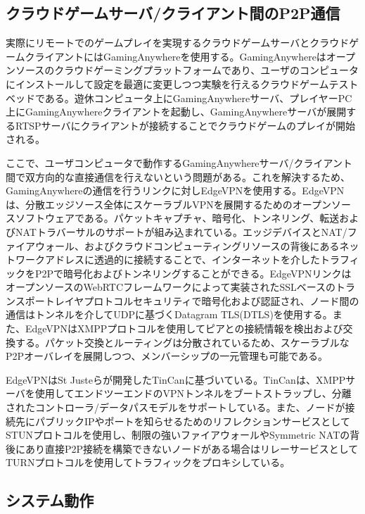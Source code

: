\subsection{クラウドゲームサーバ/クライアント間のP2P通信}
実際にリモートでのゲームプレイを実現するクラウドゲームサーバとクラウドゲームクライアントにはGamingAnywhereを使用する。GamingAnywhereはオープンソースのクラウドゲーミングプラットフォームであり、ユーザのコンピュータにインストールして設定を最適に変更しつつ実験を行えるクラウドゲームテストベッドである。遊休コンピュータ上にGamingAnywhereサーバ、プレイヤーPC上にGamingAnywhereクライアントを起動し、GamingAnywhereサーバが展開するRTSPサーバにクライアントが接続することでクラウドゲームのプレイが開始される。

ここで、ユーザコンピュータで動作するGamingAnywhereサーバ/クライアント間で双方向的な直接通信を行えないという問題がある。これを解決するため、GamingAnywhereの通信を行うリンクに対しEdgeVPN\cite{edgevpn}を使用する。EdgeVPNは、分散エッジソース全体にスケーラブルVPNを展開するためのオープンソースソフトウェアである。パケットキャプチャ、暗号化、トンネリング、転送およびNATトラバーサルのサポートが組み込まれている。エッジデバイスとNAT/ファイアウォール、およびクラウドコンピューティングリソースの背後にあるネットワークアドレスに透過的に接続することで、インターネットを介したトラフィックをP2Pで暗号化およびトンネリングすることができる。EdgeVPNリンクはオープンソースのWebRTCフレームワークによって実装されたSSLベースのトランスポートレイヤプロトコルセキュリティで暗号化および認証され、ノード間の通信はトンネルを介してUDPに基づくDatagram TLS(DTLS)\cite{dtlc}を使用する。また、EdgeVPNはXMPPプロトコル\cite{xmpp}を使用してピアとの接続情報を検出および交換する。パケット交換とルーティングは分散されているため、スケーラブルなP2Pオーバレイを展開しつつ、メンバーシップの一元管理も可能である。

EdgeVPNはSt Justeら\cite{tincan}が開発したTinCanに基づいている。TinCanは、XMPPサーバを使用してエンドツーエンドのVPNトンネルをブートストラップし、分離されたコントローラ/データパスモデルをサポートしている。また、ノードが接続先にパブリックIPやポートを知らせるためのリフレクションサービスとしてSTUNプロトコル\cite{stun}を使用し、制限の強いファイアウォールやSymmetric NATの背後にあり直接P2P接続を構築できないノードがある場合はリレーサービスとしてTURNプロトコル\cite{turn}を使用してトラフィックをプロキシしている。


\subsection{システム動作}

